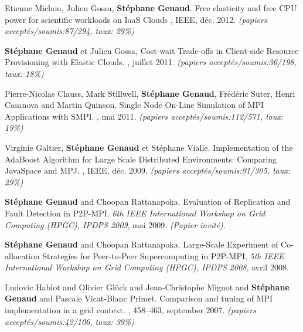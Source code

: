 \documentclass[11pt]{article}
\begin{document}
\begin{thebibliography}{99}
Etienne Michon, Julien Gossa, \textbf{Stéphane Genaud}.
\newblock Free elasticity and free CPU power for scientific workloads on IaaS Clouds
, 
IEEE, déc. 2012.
\newblock \small{\textit{(papiers acceptés/soumis:87/294, taux: 29\%)}}


\newblock \textbf{Stéphane Genaud} et Julien Gossa,
\newblock Cost-wait Trade-offs in Client-side Resource Provisioning with 
Elastic Clouds.
, juillet 2011.
\newblock \small{\textit{(papiers acceptés/soumis{:}36/198, taux: 18\%)}}


\newblock Pierre-Nicolas Clauss, Mark Stillwell, \textbf{Stéphane Genaud}, 
Fr\'ed\'eric Suter, Henri Casanova and  Martin Quinson.
\newblock Single Node On-Line Simulation of MPI Applications with SMPI.
, mai 2011.
\newblock \small{\textit{(papiers acceptés/soumis{:}112/571, taux: 19\%)}}

\newblock Virginie Galtier, \textbf{Stéphane Genaud} et Stéphane Vialle.
\newblock Implementation of the AdaBoost Algorithm for Large Scale Distributed 
Environments: Comparing JavaSpace and MPJ.
, 
IEEE, déc. 2009.
\newblock \small{\textit{(papiers acceptés/soumis:91/305, taux: 29\%)}}


\textbf{Stéphane Genaud} and Choopan Rattanapoka.
\newblock Evaluation of Replication and Fault Detection in P2P-MPI.
\newblock 
{\em 6th IEEE International Workshop on Grid Computing (HPGC), IPDPS 2009}, 
mai 2009.
\newblock \textit{(Papier invité)}.

\textbf{Stéphane Genaud} and Choopan Rattanapoka. 
\newblock Large-Scale Experiment of Co-allocation Strategies for Peer-to-Peer 
Supercomputing in P2P-MPI,
\newblock 
{\em 5th IEEE International Workshop on Grid Computing (HPGC), IPDPS 2008}, 
avril 2008.

Ludovic Hablot and Olivier Glück and Jean-Christophe Mignot and \textbf{Stéphane Genaud} and Pascale Vicat-Blanc Primet.
\newblock Comparison and tuning of MPI implementation in a grid context.
, 458--463, september 2007.
\newblock \small{\textit{(papiers acceptés/soumis:42/106, taux: 39\%)}}


\end{thebibliography}
\end{document}
